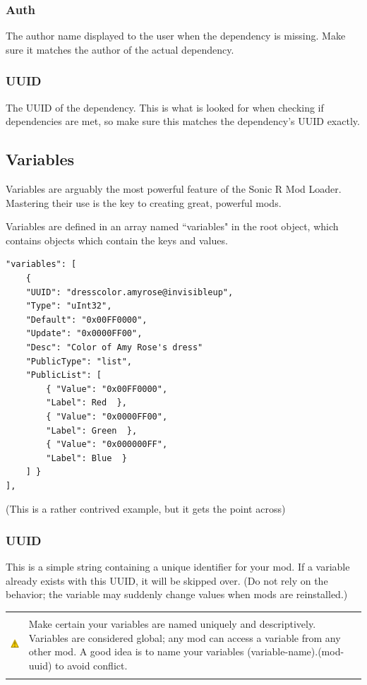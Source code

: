 \documentclass[12pt,a4paper,notitlepage]{article}
\newcommand{\warning}[1]{
    \begin{tabular}{m{1.1cm}  m{11cm}}
    &\\
    \includegraphics[width=1.1cm, height=1.1cm]{warning} & #1
    \\&\\
    \end{tabular}
}
\begin{document}
\subsubsection{Auth}
The author name displayed to the user when the dependency is missing. Make sure it matches the author of the actual dependency.

\subsubsection{UUID}
The UUID of the dependency. This is what is looked for when checking if dependencies are met, so make sure this matches the dependency's UUID exactly.

\subsection{Variables}
\label{subsec:create-var}
Variables are arguably the most powerful feature of the Sonic R Mod Loader. Mastering their use is the key to creating great, powerful mods.

Variables are defined in an array named ``variables" in the root object, which contains objects which contain the keys and values.

\begin{lstlisting}[breaklines=true]
"variables": [
    {	
    "UUID": "dresscolor.amyrose@invisibleup",
    "Type": "uInt32",
    "Default": "0x00FF0000",
    "Update": "0x0000FF00",
    "Desc": "Color of Amy Rose's dress"
    "PublicType": "list",
    "PublicList": [
        { "Value": "0x00FF0000",
        "Label": Red  },
        { "Value": "0x0000FF00",
        "Label": Green  },
        { "Value": "0x000000FF",
        "Label": Blue  }
    ] }
],
\end{lstlisting}
(This is a rather contrived example, but it gets the point across)

\subsubsection{UUID}
\label{subsubsec:create-var-uuid}
This is a simple string containing a unique identifier for your mod.
If a variable already exists with this UUID, it will be skipped over. (Do not rely on the behavior; the variable may suddenly change values when mods are reinstalled.)

\warning{Make certain your variables are named uniquely and descriptively. Variables are considered global; any mod can access a variable from any other mod. A good idea is to name your variables (variable-name).(mod-uuid) to avoid conflict.}
\end{document}
